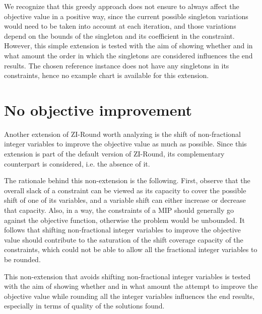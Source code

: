 \documentclass[a4paper,12pt]{book}
\begin{document}
We recognize that this greedy approach does not ensure to always affect the objective value in a positive way, since the current possible singleton variations would need to be taken into account at each iteration, and those variations depend on the bounds of the singleton and its coefficient in the constraint. However, this simple extension is tested with the aim of showing whether and in what amount the order in which the singletons are considered influences the end results. The chosen reference instance does not have any singletons in its constraints, hence no example chart is available for this extension.

\section{No objective improvement}
Another extension of ZI-Round worth analyzing is the shift of non-fractional integer variables to improve the objective value as much as possible. Since this extension is part of the default version of ZI-Round, its complementary counterpart is considered, i.e. the absence of it. \par

The rationale behind this non-extension is the following. First, observe that the overall slack of a constraint can be viewed as its capacity to cover the possible shift of one of its variables, and a variable shift can either increase or decrease that capacity. Also, in a way, the constraints of a MIP should generally go against the objective function, otherwise the problem would be unbounded. It follows that shifting non-fractional integer variables to improve the objective value should contribute to the saturation of the shift coverage capacity of the constraints, which could not be able to allow all the fractional integer variables to be rounded. \par

This non-extension that avoids shifting non-fractional integer variables is tested with the aim of showing whether and in what amount the attempt to improve the objective value while rounding all the integer variables influences the end results, especially in terms of quality of the solutions found. \par
\end{document}
